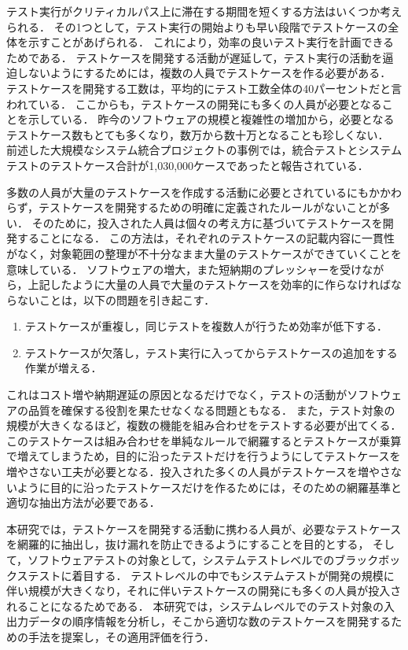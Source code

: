 テスト実行がクリティカルパス上に滞在する期間を短くする方法はいくつか考えられる．
その1つとして，テスト実行の開始よりも早い段階でテストケースの全体を示すことがあげられる．
これにより，効率の良いテスト実行を計画できるためである．
テストケースを開発する活動が遅延して，テスト実行の活動を逼迫しないようにするためには，複数の人員でテストケースを作る必要がある．
テストケースを開発する工数は，平均的にテスト工数全体の40パーセントだと言われている\cite{van2013tpi}．
ここからも，テストケースの開発にも多くの人員が必要となることを示している．
昨今のソフトウェアの規模と複雑性の増加から，必要となるテストケース数もとても多くなり，数万から数十万となることも珍しくない．
前述した大規模なシステム統合プロジェクトの事例では，統合テストとシステムテストのテストケース合計が1,030,000ケースであったと報告されている．

多数の人員が大量のテストケースを作成する活動に必要とされているにもかかわらず，テストケースを開発するための明確に定義されたルールがないことが多い．
そのために，投入された人員は個々の考え方に基づいてテストケースを開発することになる．
この方法は，それぞれのテストケースの記載内容に一貫性がなく，対象範囲の整理が不十分なまま大量のテストケースができていくことを意味している．
ソフトウェアの増大，また短納期のプレッシャーを受けながら，上記したように大量の人員で大量のテストケースを効率的に作らなければならないことは，以下の問題を引き起こす．
\begin{enumerate}
\item テストケースが重複し，同じテストを複数人が行うため効率が低下する．
\item テストケースが欠落し，テスト実行に入ってからテストケースの追加をする作業が増える．
\end{enumerate}

これはコスト増や納期遅延の原因となるだけでなく，テストの活動がソフトウェアの品質を確保する役割を果たせなくなる問題ともなる．
また，テスト対象の規模が大きくなるほど，複数の機能を組み合わせをテストする必要が出てくる．
このテストケースは組み合わせを単純なルールで網羅するとテストケースが乗算で増えてしまうため，目的に沿ったテストだけを行うようにしてテストケースを増やさない工夫が必要となる．投入された多くの人員がテストケースを増やさないように目的に沿ったテストケースだけを作るためには，そのための網羅基準と適切な抽出方法が必要である．

本研究では，テストケースを開発する活動に携わる人員が、必要なテストケースを網羅的に抽出し，抜け漏れを防止できるようにすることを目的とする，
そして，ソフトウェアテストの対象として，システムテストレベルでのブラックボックステストに着目する．
テストレベルの中でもシステムテストが開発の規模に伴い規模が大きくなり，それに伴いテストケースの開発にも多くの人員が投入されることになるためである．
本研究では，システムレベルでのテスト対象の入出力データの順序情報を分析し，そこから適切な数のテストケースを開発するための手法を提案し，その適用評価を行う．

